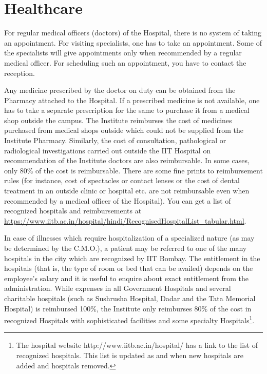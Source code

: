 \documentclass[
  10pt,
  a5paper,
  10pt,
  openany]{amsbook}
\begin{document}
\section{Healthcare}\label{healthcare}

For regular medical officers (doctors) of the Hospital, there is no
system of taking an appointment. For visiting specialists, one has to
take an appointment. Some of the specialists will give appointments only
when recommended by a regular medical officer. For scheduling such an
appointment, you have to contact the reception.

Any medicine prescribed by the doctor on duty can be obtained from the
Pharmacy attached to the Hospital. If a prescribed medicine is not
available, one has to take a separate prescription for the same to
purchase it from a medical shop outside the campus. The Institute
reimburses the cost of medicines purchased from medical shops outside
which could not be supplied from the Institute Pharmacy. Similarly, the
cost of consultation, pathological or radiological investigations
carried out outside the IIT Hospital on recommendation of the Institute
doctors are also reimbursable. In some cases, only 80\% of the cost is
reimbursable. There are some fine prints to reimbursement rules (for
instance, cost of spectacles or contact lenses or the cost of dental
treatment in an outside clinic or hospital etc. are not reimbursable
even when recommended by a medical officer of the Hospital). You can get
a list of recognized hospitals and reimbursements at
\url{https://www.iitb.ac.in/hospital/hindi/RecognisedHospitalList_tabular.html}.

In case of illnesses which require hospitalization of a specialized
nature (as may be determined by the C.M.O.), a patient may be referred
to one of the many hospitals in the city which are recognized by IIT
Bombay. The entitlement in the hospitals (that is, the type of room or
bed that can be availed) depends on the employee's salary and it is
useful to enquire about exact entitlement from the administration. While
expenses in all Government Hospitals and several charitable hospitals
(such as Sushrusha Hospital, Dadar and the Tata Memorial Hospital) is
reimbursed 100\%, the Institute only reimburses 80\% of the cost in
recognized Hospitals with sophisticated facilities and some specialty
Hospitals\footnote{The hospital website http://www.iitb.ac.in/hospital/
  has a link to the list of recognized hospitals. This list is updated
  as and when new hospitals are added and hospitals removed.}.
\end{document}
